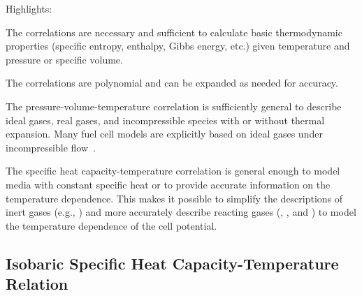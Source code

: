 \begin{contextbox}
  Highlights:
  \begin{itemize*}
    \item The correlations are necessary and sufficient to calculate basic thermodynamic properties (specific entropy, enthalpy, Gibbs energy, etc.) given temperature and pressure or specific volume.
    \item The correlations are polynomial and can be expanded as needed for accuracy.
    \item The pressure-volume-temperature correlation is sufficiently general to describe ideal gases, real gases, and incompressible species with or without thermal expansion.  Many fuel cell models are explicitly based on ideal gases under incompressible flow~\cite{Bernardi1991, Ceraolo2003, Karnik2007, Kim2010, Natarajan2001, Nguyen1993, Rubio2010, Sivertsen2005, Spiegel2008, Springer1991, Sunden2011, Um2000, Um2004, Wang2001, Wang2006, Weber2004, Yuan2010}.
    \item The specific heat capacity-temperature correlation is general enough to model media with constant specific heat or to provide accurate information on the temperature dependence.  This makes it possible to simplify the descriptions of inert gases (e.g., ) and more accurately describe reacting gases (, , and ) to model the temperature dependence of the cell potential.
  \end{itemize*}
\end{contextbox}
\vspace{0.7\baselineskip}


\subsection{Isobaric Specific Heat Capacity-Temperature Relation}

